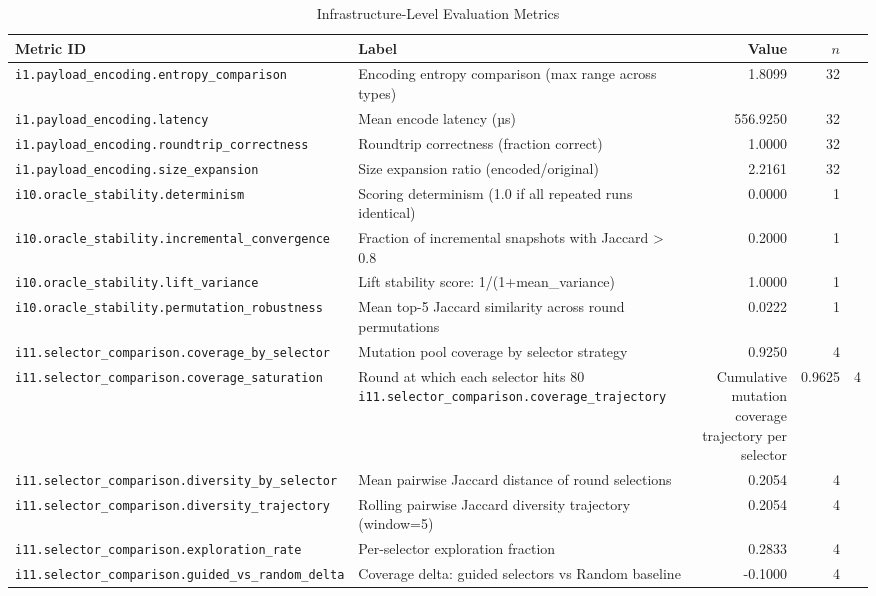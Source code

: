 \begin{table}[htbp]
\centering
\caption{Infrastructure-Level Evaluation Metrics}
\label{tab:infra-metrics}
\begin{tabular}{llrr}
\toprule
Metric ID & Label & Value & $n$ \\
\midrule
\texttt{i1.payload\_encoding.entropy\_comparison} & Encoding entropy comparison (max range across types) & 1.8099 & 32 \\
\texttt{i1.payload\_encoding.latency} & Mean encode latency (µs) & 556.9250 & 32 \\
\texttt{i1.payload\_encoding.roundtrip\_correctness} & Roundtrip correctness (fraction correct) & 1.0000 & 32 \\
\texttt{i1.payload\_encoding.size\_expansion} & Size expansion ratio (encoded/original) & 2.2161 & 32 \\
\midrule
\texttt{i10.oracle\_stability.determinism} & Scoring determinism (1.0 if all repeated runs identical) & 0.0000 & 1 \\
\texttt{i10.oracle\_stability.incremental\_convergence} & Fraction of incremental snapshots with Jaccard > 0.8 & 0.2000 & 1 \\
\texttt{i10.oracle\_stability.lift\_variance} & Lift stability score: 1/(1+mean\_variance) & 1.0000 & 1 \\
\texttt{i10.oracle\_stability.permutation\_robustness} & Mean top-5 Jaccard similarity across round permutations & 0.0222 & 1 \\
\midrule
\texttt{i11.selector\_comparison.coverage\_by\_selector} & Mutation pool coverage by selector strategy & 0.9250 & 4 \\
\texttt{i11.selector\_comparison.coverage\_saturation} & Round at which each selector hits 80%
\texttt{i11.selector\_comparison.coverage\_trajectory} & Cumulative mutation coverage trajectory per selector & 0.9625 & 4 \\
\texttt{i11.selector\_comparison.diversity\_by\_selector} & Mean pairwise Jaccard distance of round selections & 0.2054 & 4 \\
\texttt{i11.selector\_comparison.diversity\_trajectory} & Rolling pairwise Jaccard diversity trajectory (window=5) & 0.2054 & 4 \\
\texttt{i11.selector\_comparison.exploration\_rate} & Per-selector exploration fraction & 0.2833 & 4 \\
\texttt{i11.selector\_comparison.guided\_vs\_random\_delta} & Coverage delta: guided selectors vs Random baseline & -0.1000 & 4 \\

\end{tabular}
\end{table}
